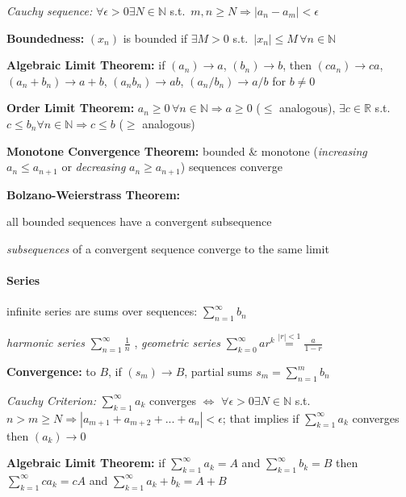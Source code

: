 \documentclass[8pt,twoside]{extarticle}
\begin{document}
\begin{multicols}{2}
 \textit{Cauchy sequence:} $\forall \epsilon>0\exists N\in\mathbb{N}$ s.t.\ $m,n\geq N\Rightarrow |a_n-a_m|<\epsilon$

 \textbf{Boundedness:} $(x_n)$ is bounded if $\exists M>0$ s.t.\ $|x_n|\leq M \,\forall n\in \mathbb{N}$

 \textbf{Algebraic Limit Theorem:} if $(a_n){\to} a$, $(b_n){\to} b$, then $(ca_n) {\to} ca$, $(a_n {+} b_n){\to} a{+}b$, $(a_nb_n){\to} ab$, $(a_n/b_n){\to} a/b$ for $b\neq 0$

 \textbf{Order Limit Theorem:} $a_n\geq 0 \, \forall n\in\mathbb{N} \Rightarrow a\geq 0$ ($\leq$ analogous), $\exists c\in\mathbb{R}$ s.t.\ $c\leq b_n\forall n\in\mathbb{N}\Rightarrow c\leq b$ ($\geq$ analogous)



 \textbf{Monotone Convergence Theorem:} bounded \& monotone (\textit{increasing} $a_n {\leq} a_{n+1}$ or \textit{decreasing} $a_n {\geq} a_{n+1}$) sequences converge



 \textbf{Bolzano-Weierstrass Theorem:} 
 
 all bounded sequences have a convergent subsequence

 \textit{subsequences} of a convergent sequence converge to the same limit




\paragraph{Series} infinite series are sums over sequences: $\sum_{n=1}^\infty b_n$

 \textit{harmonic series} $\sum_{n=1}^\infty \frac{1}{n}$
, \textit{geometric series} $\sum_{k=0}^\infty ar^k \overset{|r|<1}{=} \frac{a}{1-r}$

 \textbf{Convergence:} to $B$, if $(s_m){\to} B$, partial sums $s_m=\sum_{n=1}^m b_n$

 \textit{Cauchy Criterion:} $\sum_{k=1}^\infty a_k$ converges $\Leftrightarrow$ \newline
$\forall \epsilon>0\exists N\in\mathbb{N}$ s.t.\ $n>m\geq N \Rightarrow |a_{m+1} + a_{m+2}+...+a_n|<\epsilon$;
that implies if $\sum_{k=1}^\infty a_k$ converges then $(a_k)\to 0$



 \textbf{Algebraic Limit Theorem:}  if $\sum_{k=1}^\infty a_k = A$ and $\sum_{k=1}^\infty b_k = B$ then $\sum_{k=1}^\infty ca_k = cA$ and $\sum_{k=1}^\infty a_k+ b_k = A+B$



\end{multicols}
\end{document}
